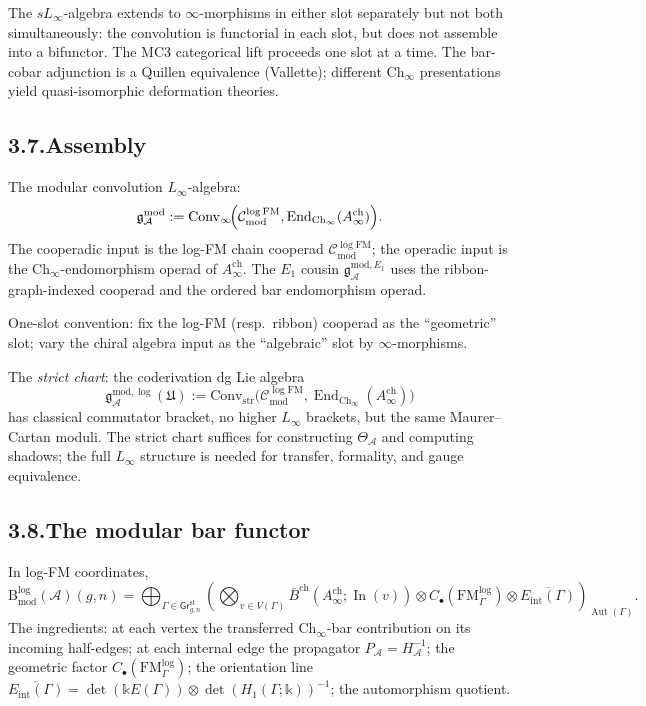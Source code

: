\documentclass[11pt]{report}
\theoremstyle{definition}
\theoremstyle{remark}
\providecommand{\cA}{\mathcal{A}}
\providecommand{\cC}{\mathcal{C}}
\providecommand{\Convinf}{\mathrm{Conv}_\infty}
\providecommand{\Convstr}{\mathrm{Conv}_{\mathrm{str}}}
\providecommand{\Bbbk}{\mathbb{k}}
\numberwithin{equation}{section}
\begin{document}
The $sL_\infty$-algebra extends to $\infty$-morphisms in either slot
separately but not both simultaneously: the convolution is
functorial in each slot, but does not assemble into a bifunctor. The
MC3 categorical lift proceeds one slot at a time. The bar-cobar
adjunction is a Quillen equivalence (Vallette); different
$\mathrm{Ch}_\infty$ presentations yield quasi-isomorphic
deformation theories.

\subsection*{3.7.\enspace Assembly}

The modular convolution $L_\infty$-algebra:
\begin{equation}\label{eq:pref-convolution}
\mathfrak g^{\mathrm{mod}}_\cA:=\Convinf\!\Bigl(\cC^{\log\mathrm{FM}}_{\mathrm{mod}},\operatorname{End}_{\mathrm{Ch}_\infty}(A^{\mathrm{ch}}_\infty)\Bigr).
\end{equation}
The cooperadic input is the log-FM chain cooperad
$\cC^{\log\mathrm{FM}}_{\mathrm{mod}}$; the operadic input is the
$\mathrm{Ch}_\infty$-endomorphism operad of
$A^{\mathrm{ch}}_\infty$. The $E_1$ cousin
$\mathfrak g^{\mathrm{mod},E_1}_\cA$ uses the ribbon-graph-indexed
cooperad and the ordered bar endomorphism operad.

One-slot convention: fix the log-FM (resp.\ ribbon) cooperad as the
``geometric'' slot; vary the chiral algebra input as the ``algebraic''
slot by $\infty$-morphisms.

The \emph{strict chart}: the coderivation dg Lie algebra
\[
\mathfrak g^{\mathrm{mod},\log}_\cA(\mathfrak U):=\Convstr\!\bigl(\cC^{\log\mathrm{FM}}_{\mathrm{mod}},\operatorname{End}_{\mathrm{Ch}_\infty}(A^{\mathrm{ch}}_\infty)\bigr)
\]
has classical commutator bracket, no higher $L_\infty$ brackets, but
the same Maurer--Cartan moduli. The strict chart suffices for
constructing $\Theta_\cA$ and computing shadows; the full $L_\infty$
structure is needed for transfer, formality, and gauge equivalence.

\subsection*{3.8.\enspace The modular bar functor}

In log-FM coordinates,
\[
\mathrm B^{\log}_{\mathrm{mod}}(\cA)(g,n)=\bigoplus_{\Gamma\in\mathsf{Gr}^{\mathrm{st}}_{g,n}}\left(\bigotimes_{v\in V(\Gamma)}\bar B^{\mathrm{ch}}(A^{\mathrm{ch}}_\infty;\operatorname{In}(v))\otimes C_\bullet(\mathrm{FM}^{\log}_\Gamma)\otimes\overline{E_{\mathrm{int}}(\Gamma)}\right)_{\!\operatorname{Aut}(\Gamma)}.
\]
The ingredients: at each vertex the transferred
$\mathrm{Ch}_\infty$-bar contribution on its incoming half-edges;
at each internal edge the propagator $P_\cA=H_\cA^{-1}$; the geometric
factor $C_\bullet(\mathrm{FM}^{\log}_\Gamma)$; the orientation line
$\overline{E_{\mathrm{int}}(\Gamma)}=\det(\Bbbk E(\Gamma))\otimes\det(H_1(\Gamma;\Bbbk))^{-1}$;
the automorphism quotient.
\end{document}
